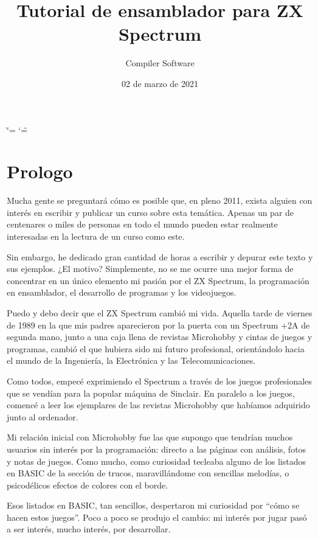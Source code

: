 \documentclass[letterpaper,10pt,spanish]{sphinxmanual}
\title{Tutorial de ensamblador para ZX Spectrum}
\date{02 de marzo de 2021}
\author{Compiler Software}
\begin{document}
\ifdefined\shorthandoff
  \ifnum\catcode`\=\string=\active\shorthandoff{=}\fi
  \ifnum\catcode`\"=\active{}\fi
\fi

\pagestyle{empty}
\sphinxmaketitle
\pagestyle{plain}
\sphinxtableofcontents
\pagestyle{normal}
\label{\detokenize{index::doc}}



\chapter{Prologo}
\label{\detokenize{01_prologo/prologo:prologo}}\label{\detokenize{01_prologo/prologo::doc}}
Mucha gente se preguntará cómo es posible que, en pleno 2011, exista alguien con interés en escribir y publicar un curso sobre esta temática. Apenas un par de centenares o miles de personas en todo el mundo pueden estar realmente interesadas en la lectura de un curso como este.

Sin embargo, he dedicado gran cantidad de horas a escribir y depurar este texto y sus ejemplos. ¿El motivo? Simplemente, no se me ocurre una mejor forma de concentrar en un único elemento mi pasión por el ZX Spectrum, la programación en ensamblador, el desarrollo de programas y los videojuegos.

Puedo y debo decir que el ZX Spectrum cambió mi vida. Aquella tarde de viernes de 1989 en la que mis padres aparecieron por la puerta con un Spectrum +2A de segunda mano, junto a una caja llena de revistas Microhobby y cintas de juegos y programas, cambió el que hubiera sido mi futuro profesional, orientándolo hacia el mundo de la Ingeniería, la Electrónica y las Telecomunicaciones.

Como todos, empecé exprimiendo el Spectrum a través de los juegos profesionales que se vendían para la popular máquina de Sinclair. En paralelo a los juegos, comencé a leer los ejemplares de las revistas Microhobby que habíamos adquirido junto al ordenador.

Mi relación inicial con Microhobby fue las que supongo que tendrían muchos usuarios sin interés por la programación: directo a las páginas con análisis, fotos y notas de juegos. Como mucho, como curiosidad tecleaba alguno de los listados en BASIC de la sección de trucos, maravillándome con sencillas melodías, o psicodélicos efectos de colores con el borde.

Esos listados en BASIC, tan sencillos, despertaron mi curiosidad por “cómo se hacen estos juegos”. Poco a poco se produjo el cambio: mi interés por jugar pasó a ser interés, mucho interés, por desarrollar.
\end{document}
